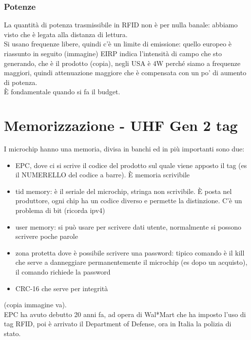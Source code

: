 \documentclass[oneside, 12pt]{extbook}
\begin{document}
\subsubsection{Potenze}
La quantità di potenza trasmissibile in RFID non è per nulla banale: abbiamo visto che è legata alla distanza di lettura.\\Si usano frequenze libere, quindi c'è un limite di emissione: quello europeo è riassunto in seguito
(immagine)
EIRP indica l'intensità di campo che sto generando, che è il prodotto (copia), negli USA è 4W perché siamo a frequenze maggiori, quindi attenuazione maggiore che è compensata con un po' di aumento di potenza.\\È fondamentale quando si fa il budget.

\section{Memorizzazione - UHF Gen 2 tag}
I microchip hanno una memoria, divisa in banchi ed in più importanti sono due:
\begin{itemize}
	\item EPC, dove ci si scrive il codice del prodotto sul quale viene apposto il tag (es il NUMERELLO del codice a barre). È memoria scrivibile
	\item tid memory: è il seriale del microchip, stringa non scrivibile. È posta nel produttore, ogni chip ha un codice diverso e permette la distinzione. C'è un problema di bit (ricorda ipv4)
	\item user memory: si può usare per scrivere dati utente, normalmente si possono scrivere poche parole
	\item zona protetta dove è possibile scrivere una password: tipico comando è il kill che serve a danneggiare permanentemente il microchip (es dopo un acquisto), il comando richiede la password
	\item CRC-16 che serve per integrità
\end{itemize}
(copia immagine va).\\EPC ha avuto debutto 20 anni fa, ad opera di Wal*Mart che ha imposto l'uso di tag RFID, poi è arrivato il Department of Defense, ora in Italia la polizia di stato.
\end{document}
